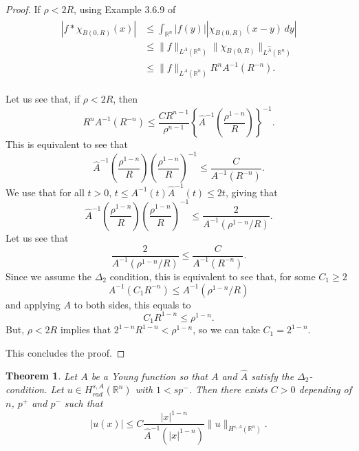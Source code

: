 \documentclass[leqno,twoside, 12pt]{amsart}
\theoremstyle{plain}
\numberwithin{equation}{section} \numberwithin{figure}{section}
\newtheorem{theorem}{Theorem}[section]
\theoremstyle{definition}
\newcommand{\R}{\mathbb R}
\numberwithin{equation}{section}
\begin{document}
\begin{proof}
If $\rho<2R$, using Example 3.6.9 of \cite{kufner}
\begin{align} \label{f.2}
\begin{split}
|f*\chi_{B(0,R)}(x)|&\leq \int_{\R^n} |f(y)||\chi_{B(0,R)}(x-y)\,dy|\\
&\leq
\|f\|_{L^A(\R^n)} \| \chi_{B(0,R)}\|_{L^{\hat A}(\R^n)}\\
&\leq
\|f\|_{L^A(\R^n)} R^n A^{-1}\left(R^{-n} \right).
\end{split}
\end{align}

Let us see that, if $\rho<2R$, then
$$
R^n A^{-1}\left(R^{-n} \right) \le \frac{CR^{n-1}}{\rho^{n-1}} \left\{\hat A^{-1}\left( \frac{\rho^{1-n}}{R}\right) \right\}^{-1}.
$$
This is equivalent to see that
$$
  \hat A^{-1}\left( \frac{\rho^{1-n}}{R}\right) \left(\frac{\rho^{1-n}}{R} \right)^{-1}  \le   \frac{C}{A^{-1}\left(R^{-n} \right)}.
$$
We use that for all $t>0$, $t\leq A^{-1}(t)\hat A^{-1}(t)\leq 2t$, giving that
$$
  \hat A^{-1}\left( \frac{\rho^{1-n}}{R}\right) \left(\frac{\rho^{1-n}}{R} \right)^{-1} \leq \frac{2}{A^{-1}(\rho^{1-n}/R)}.
$$
Let us see that
$$
\frac{2}{A^{-1}(\rho^{1-n}/R)} \leq \frac{C}{A^{-1}\left(R^{-n} \right)}. 
$$
Since we assume the $\Delta_2$ condition, this is equivalent to see that, for some $C_1\geq 2$
$$
 A^{-1}\left(C_1 R^{-n} \right) \leq A^{-1}(\rho^{1-n}/R)
$$
and applying $A$ to both sides, this equals to
$$
C_1 R^{1-n} \leq \rho^{1-n}.
$$
But, $\rho<2R$ implies that $2^{1-n} R^{1-n} < \rho^{1-n}$, so we can take $C_1=2^{1-n}$. 

This concludes the proof.
\end{proof}

\begin{theorem} \label{teo.straus}
Let $A$ be a Young function so that $A$ and $\hat A$ satisfy the $\Delta_2$-condition. Let $u\in H^{s,A}_{rad}(\R^n)$ with  $1<sp^-$. Then there exists $C>0$ depending of $n$, $p^+$ and $p^-$ such that
$$
|u(x)|\leq C \frac{|x|^{1-n}}{\hat A^{-1}(|x|^{1-n})} \|u\|_{H^{s,A}(\R^n)}.
$$\end{theorem}
\end{document}
